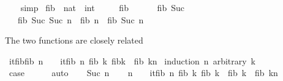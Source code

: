 \begin{isabellebody}
%
\isadelimproof
\ \ %
\endisadelimproof
%
\isatagproof
{}\isamarkupfalse%
\ simp%
\endisatagproof
{\isafoldproof}%
%
\isadelimproof
\isanewline
%
\endisadelimproof
\isanewline
{}\isamarkupfalse%
\ fib\ {\isacharcolon}{\kern0pt}{\isacharcolon}{\kern0pt}\ {\isachardoublequoteopen}nat\ {\isasymRightarrow}\ int{\isachardoublequoteclose}\ \isanewline
\ \ \ \ {\isachardoublequoteopen}fib\ {}\ {\isacharequal}{\kern0pt}\ {}{\isachardoublequoteclose}\isanewline
\ \ {\isacharbar}{\kern0pt}\ {\isachardoublequoteopen}fib\ {\isacharparenleft}{\kern0pt}Suc\ {}{\isacharparenright}{\kern0pt}\ {\isacharequal}{\kern0pt}\ {}{\isachardoublequoteclose}\isanewline
\ \ {\isacharbar}{\kern0pt}\ {\isachardoublequoteopen}fib\ {\isacharparenleft}{\kern0pt}Suc\ {\isacharparenleft}{\kern0pt}Suc\ n{\isacharparenright}{\kern0pt}{\isacharparenright}{\kern0pt}\ {\isacharequal}{\kern0pt}\ fib\ n\ {\isacharplus}{\kern0pt}\ fib\ {\isacharparenleft}{\kern0pt}Suc\ n{\isacharparenright}{\kern0pt}{\isachardoublequoteclose}%
\begin{isamarkuptext}%
The two functions are closely related%
\end{isamarkuptext}\isamarkuptrue%
\isamarkupfalse%
\ itfib{\isacharunderscore}{\kern0pt}fib{\isacharcolon}{\kern0pt}\ {\isachardoublequoteopen}n\ {\isachargreater}{\kern0pt}\ {}\ {\isasymLongrightarrow}\ itfib\ n\ {\isacharparenleft}{\kern0pt}fib\ k{\isacharparenright}{\kern0pt}\ {\isacharparenleft}{\kern0pt}fib{\isacharparenleft}{\kern0pt}k{\isacharplus}{\kern0pt}{}{\isacharparenright}{\kern0pt}{\isacharparenright}{\kern0pt}\ {\isacharequal}{\kern0pt}\ fib\ {\isacharparenleft}{\kern0pt}k{\isacharplus}{\kern0pt}n{\isacharparenright}{\kern0pt}{\isachardoublequoteclose}\isanewline
%
\isadelimproof
%
\endisadelimproof
%
\isatagproof
{}\isamarkupfalse%
\ {\isacharparenleft}{\kern0pt}induction\ n\ arbitrary{\isacharcolon}{\kern0pt}\ k{\isacharparenright}{\kern0pt}\isanewline
\ \ \isamarkupfalse%
\ {}\isanewline
\ \ \isamarkupfalse%
\ \isamarkupfalse%
\ {\isacharquery}{\kern0pt}case\isanewline
\ \ \ \ \isamarkupfalse%
\ auto\isanewline
{}\isamarkupfalse%
\isanewline
\ \ \isamarkupfalse%
\ {\isacharparenleft}{\kern0pt}Suc\ n{\isacharparenright}{\kern0pt}\isanewline
\ \ \isamarkupfalse%
\ {\isachardoublequoteopen}n\ {\isachargreater}{\kern0pt}\ {}\ {\isasymLongrightarrow}\ itfib\ n\ {\isacharparenleft}{\kern0pt}fib\ {\isacharparenleft}{\kern0pt}k{\isacharplus}{\kern0pt}{}{\isacharparenright}{\kern0pt}{\isacharparenright}{\kern0pt}\ {\isacharparenleft}{\kern0pt}fib\ k\ {\isacharplus}{\kern0pt}\ fib\ {\isacharparenleft}{\kern0pt}k{\isacharplus}{\kern0pt}{}{\isacharparenright}{\kern0pt}{\isacharparenright}{\kern0pt}\ {\isacharequal}{\kern0pt}\ fib\ {\isacharparenleft}{\kern0pt}k{\isacharplus}{\kern0pt}n{\isacharplus}{\kern0pt}{}{\isacharparenright}{\kern0pt}{\isachardoublequoteclose}\isanewline

\end{isabellebody}
